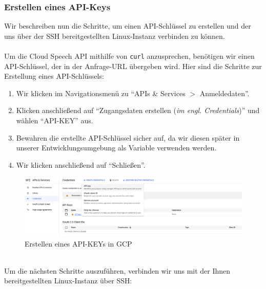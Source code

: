 \documentclass[12pt,a4paper]{article}
\begin{document}
\subsubsection{Erstellen eines API-Keys}
\label{subsubsec:generate-key} 
Wir beschreiben nun die Schritte, um einen API-Schlüssel zu erstellen und der uns über der SSH bereitgestellten Linux-Instanz verbinden zu können.
\\ \\
Um die Cloud Speech API mithilfe von \texttt{curl} anzusprechen, benötigen wir einen API-Schlüssel, der in der Anfrage-URL übergeben wird. Hier sind die Schritte zur Erstellung eines API-Schlüssels:
\begin{enumerate}
	\item Wir klicken im Navigationsmenü zu \enquote{APIs \& Services $>$ Anmeldedaten}.
	
	\item Klicken anschließend auf \enquote{Zugangsdaten erstellen (\textit{im engl. Credentials})} und wählen \enquote{API-KEY} aus.
	
	\item Bewahren die erstellte API-Schlüssel sicher auf, da wir diesen später in unserer Entwicklungsumgebung als Variable verwenden werden.
	
	\item Wir klicken anschließend auf \enquote{Schließen}.
\end{enumerate}
\begin{figure}[h!]
	\centering
	\includegraphics[width=1\linewidth]{../images/GCP_CREATE_API}
	\caption{Erstellen eines API-KEYs in GCP}
	\label{fig:gcpcreateapi}
\end{figure}
\ \\
Um die nächsten Schritte auszuführen, verbinden wir uns mit der Ihnen bereitgestellten Linux-Instanz über SSH:
\end{document}

